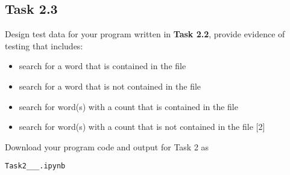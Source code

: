 \subsection*{Task 2.3}

Design test data for your program written in \textbf{Task 2.2}, provide
evidence of testing that includes:
\begin{itemize}
\item search for a word that is contained in the file 
\item search for a word that is not contained in the file
\item search for word(s) with a count that is contained in the file 
\item search for word(s) with a count that is not contained in the file
\hfill{} {[}2{]}
\end{itemize}
Download your program code and output for Task 2 as 

\texttt{Task2\_<your name>\_<centre number>\_<index number>.ipynb}